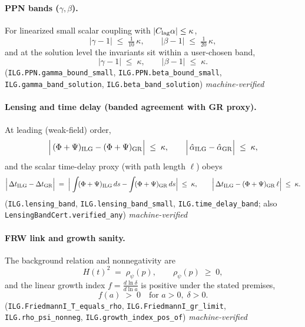 \documentclass[12pt,a4paper]{article}
\begin{document}
\paragraph{PPN bands ($\gamma,\beta$).}
For linearized small scalar coupling with \(|C_{\rm lag}\alpha|\le \kappa\),
\begin{equation}
  \bigl|\gamma-1\bigr| \;\le\; \tfrac{1}{10}\,\kappa,
  \qquad
  \bigl|\beta -1\bigr| \;\le\; \tfrac{1}{20}\,\kappa,
  \label{eq:ppn-small}
\end{equation}
and at the solution level the invariants sit within a user-chosen band,
\begin{equation}
  \bigl|\gamma-1\bigr| \;\le\; \kappa,
  \qquad
  \bigl|\beta -1\bigr| \;\le\; \kappa.
  \label{eq:ppn-solution}
\end{equation}
(\texttt{ILG.PPN.gamma\_bound\_small}, \texttt{ILG.PPN.beta\_bound\_small}, \texttt{ILG.gamma\_band\_solution}, \texttt{ILG.beta\_band\_solution}) \hfill\emph{machine-verified}

\paragraph{Lensing and time delay (banded agreement with GR proxy).}
At leading (weak-field) order,
\begin{equation}
  \Bigl|\,(\Phi+\Psi)_{\rm ILG}-(\Phi+\Psi)_{\rm GR}\Bigr| \;\le\; \kappa,
  \qquad
  \Bigl|\,\hat\alpha_{\rm ILG}-\hat\alpha_{\rm GR}\Bigr|\;\le\;\kappa,
  \label{eq:lensing-band}
\end{equation}
and the scalar time-delay proxy (with path length \(\ell\)) obeys
\begin{equation}
  \Bigl|\,\Delta t_{\rm ILG}-\Delta t_{\rm GR}\Bigr|
  \;=\;
  \Bigl|\;\int\! (\Phi+\Psi)_{\rm ILG}\,ds - \int\! (\Phi+\Psi)_{\rm GR}\,ds\Bigr|
  \;\le\; \kappa,
  \qquad
  \Bigl|\,\Delta t_{\rm ILG} - (\Phi+\Psi)_{\rm GR}\,\ell\Bigr|\;\le\;\kappa.
  \label{eq:time-delay-band}
\end{equation}
(\texttt{ILG.lensing\_band}, \texttt{ILG.lensing\_band\_small}, \texttt{ILG.time\_delay\_band}; also \texttt{LensingBandCert.verified\_any}) \hfill\emph{machine-verified}

\paragraph{FRW link and growth sanity.}
The background relation and nonnegativity are
\begin{equation}
  H(t)^2 \;=\; \rho_\psi(p), 
  \qquad \rho_\psi(p)\;\ge\;0,
  \label{eq:friedmannI-rho}
\end{equation}
and the linear growth index \(f=\frac{d\ln\delta}{d\ln a}\) is positive under the stated premises,
\begin{equation}
  f(a)\;>\;0 \quad \text{for } a>0,\;\delta>0.
  \label{eq:growth-index-pos}
\end{equation}
(\texttt{ILG.FriedmannI\_T\_equals\_rho}, \texttt{ILG.FriedmannI\_gr\_limit}, \texttt{ILG.rho\_psi\_nonneg}, \texttt{ILG.growth\_index\_pos\_of}) \hfill\emph{machine-verified}
\end{document}
